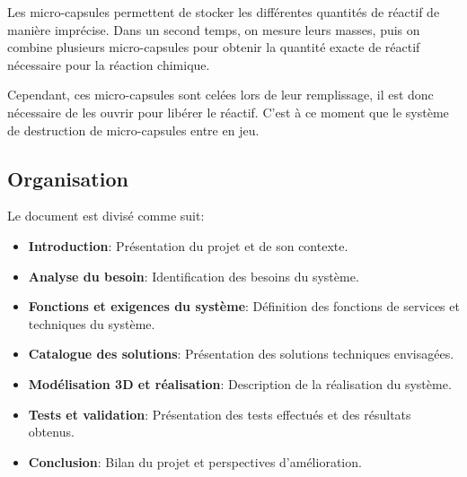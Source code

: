 \vspace{0.3cm}
Les micro-capsules permettent de stocker les différentes quantités de réactif de manière imprécise. Dans un second temps, on mesure leurs masses, puis on combine plusieurs micro-capsules pour obtenir la quantité exacte de réactif nécessaire pour la réaction chimique.

\vspace{0.3cm}
Cependant, ces micro-capsules sont celées lors de leur remplissage, il est donc nécessaire de les ouvrir pour libérer le réactif. C'est à ce moment que le système de destruction de micro-capsules entre en jeu.

\subsection{Organisation}
Le document est divisé comme suit:
\begin{itemize}[label=\textbullet]
    \item \textbf{Introduction}: Présentation du projet et de son contexte.
    \item \textbf{Analyse du besoin}: Identification des besoins du système.
    \item \textbf{Fonctions et exigences du système}: Définition des fonctions de services et techniques du système.
    \item \textbf{Catalogue des solutions}: Présentation des solutions techniques envisagées.
    \item \textbf{Modélisation 3D et réalisation}: Description de la réalisation du système.
    \item \textbf{Tests et validation}: Présentation des tests effectués et des résultats obtenus.
    \item \textbf{Conclusion}: Bilan du projet et perspectives d'amélioration.
\end{itemize}
\newpage
